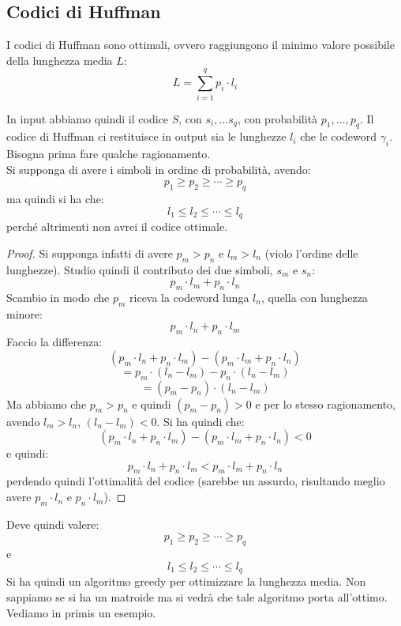 \documentclass[a4paper,12pt, oneside]{book}
\begin{document}
\subsection{Codici di Huffman}
I codici di Huffman sono ottimali, ovvero raggiungono il minimo valore possibile
della lunghezza media $L$:
\[L=\sum_{i=1}^q p_i\cdot l_i\]
\begin{teorema}
  In input abbiamo quindi il codice $S$, con $s_i,\ldots s_q$, con probabilità
  $p_1,\ldots, p_q$. Il codice di Huffman ci restituisce in output sia le
  lunghezze $l_i$ che le codeword $\gamma_i$.\\
  Bisogna prima fare qualche ragionamento.\\
  Si supponga di avere i simboli in ordine di probabilità, avendo:
  \[p_1\geq p_2\geq \cdots\geq p_q\]
  ma quindi si ha che:
  \[l_1\leq l_2\leq \cdots \leq l_q\]
  perché altrimenti non avrei il codice ottimale.
\end{teorema}
\begin{proof}
  Si supponga infatti di avere
  $p_m>p_n$ e $l_m>l_n$ (violo l'ordine delle lunghezze). Studio quindi il
  contributo dei due simboli, $s_m$ e $s_n$: 
  \[p_m\cdot l_m+p_n\cdot l_n\]
  Scambio in modo che $p_m$ riceva la codeword lunga $l_n$, quella con lunghezza
  minore:
  \[p_m\cdot l_n+p_n\cdot l_m\]
  Faccio la differenza:
  \[(p_m\cdot l_n+p_n\cdot l_m)-(p_m\cdot l_m+p_n\cdot l_n)\]
  \[=p_m\cdot (l_n-l_m)-p_n\cdot (l_n-l_m)\]
  \[=(p_m-p_n)\cdot(l_n-l_m)\]
  Ma abbiamo che $p_m>p_n$ e quindi $(p_m-p_n)>0$ e per lo stesso ragionamento,
  avendo $l_m>l_n$, $(l_n-l_m)<0$. Si ha quindi che:
  \[(p_m\cdot l_n+p_n\cdot l_m)-(p_m\cdot l_m+p_n\cdot l_n)<0\]
  e quindi:
  \[p_m\cdot l_n+p_n\cdot l_m<p_m\cdot l_m+p_n\cdot l_n\]
  perdendo quindi l'ottimalità del codice (sarebbe un assurdo, risultando meglio
  avere $p_m\cdot l_n$ e $p_n\cdot l_m$). 
\end{proof}
Deve quindi valere:
\[p_1\geq p_2\geq \cdots\geq p_q\]
e
\[l_1\leq l_2\leq \cdots \leq l_q\]
Si ha quindi un algoritmo greedy per ottimizzare la lunghezza media. Non
sappiamo se si ha un matroide ma si vedrà che tale algoritmo porta
all'ottimo. Vediamo in primis un esempio.
\end{document}
